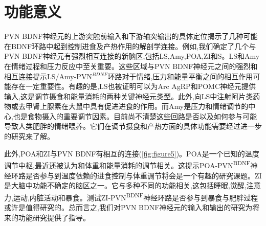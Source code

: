 \section{功能意义}
PVN BDNF神经元的上游突触前输入和下游轴突输出的具体定位揭示了几种可能在BDNF环路中起到控制进食及产热作用的解剖学连接。例如,我们确定了几个与PVN BDNF神经元有强烈相互连接的新脑区,包括LS,Amy,POA,ZI和S。LS和Amy在情绪过程和压力反应中至关重要\citep{yadin1993role,menard1996lateral}。这些区域与PVN BDNF神经元之间的强烈和相互连接提示LS/Amy-PVN$^{BDNF}$环路对于情绪,压力和能量平衡之间的相互作用可能存在一定重要性。有趣的是,LS也被证明可以为Arc AgRP和POMC神经元提供输入,这是调节摄食和能量消耗的两种关键神经元类型\citep{wang2015whole}。此外,向LS中注射阿片类药物或去甲肾上腺素在大鼠中具有促进进食的作用\citep{majeed1986stimulation,scopinho2008alpha1}。而Amy是压力和情绪调节的中心,也是食物摄入的重要调节因素\citep{zhang2011amygdala,cai2014central,douglass2017central}。目前尚不清楚这些回路是否以及如何参与可能导致人类肥胖的情绪喂养\citep{kishi2005body}。它们在调节摄食和产热方面的具体功能需要经过进一步的研究来了解。

此外,POA和ZI与PVN BDNF有相互的连接(\figurename{\ref{fig:figure5}})。POA是一个已知的温度调节中枢,最近还被认为和体重和能量消耗的调节相关\citep{morrison2011central,yu2016glutamatergic,zhao2017hypothalamic,tan2018regulation}。这提示POA-PVN\textsuperscript{BDNF}神经环路是否参与到温度依赖的进食控制与体重调节将会是一个有趣的研究课题。ZI是大脑中功能不确定的脑区之一。它与多种不同的功能相关,这包括睡眠\citep{liu2017lhx6},觉醒\citep{roger1985afferents,power2001evidence},注意力\citep{chometton2017rostromedial,tait2017effects},运动\citep{milner1988electrical,supko1991activation,murer1993circling,perier2002behavioral},内脏活动\citep{huang1974differential,walsh1977some}和暴食\citep{zhang2017rapid}。测试ZI-PVN\textsuperscript{BDNF}神经环路是否参与到暴食与肥胖过程或许是值得研究的。总而言之,我们对PVN BDNF神经元的输入和输出的研究为将来的功能研究提供了指导。



